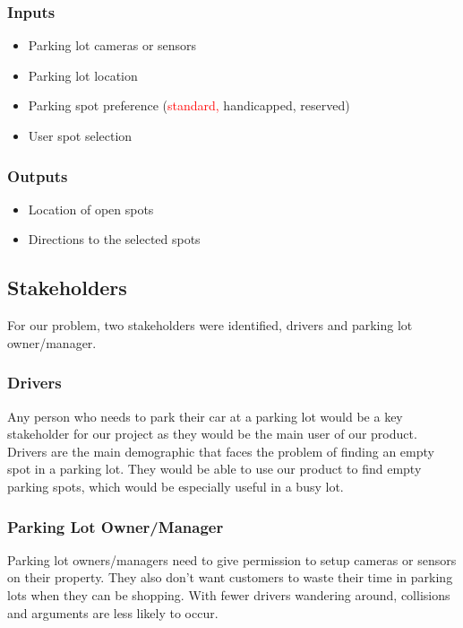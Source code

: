 \documentclass[12pt,letterpaper]{article}
\begin{document}
\subsubsection{Inputs}
\begin{itemize}
    \item Parking lot cameras or sensors
    \item Parking lot location
    \item Parking spot preference (\textcolor{red}{standard, }handicapped,
    reserved)
    \item User spot selection
\end{itemize}

\subsubsection{Outputs}
\begin{itemize}
    \item Location of open spots
    \item Directions to the selected spots
\end{itemize}

\subsection{Stakeholders}
For our problem, two stakeholders were identified, drivers and parking lot
owner/manager.

\subsubsection{Drivers}
Any person who needs to park their car at a parking lot would be a key
stakeholder for our project as they would be the main user of our product.
Drivers are the main demographic that faces the problem of finding an empty spot
in a parking lot. They would be able to use our product to find empty parking
spots, which would be especially useful in a busy lot.

\subsubsection{Parking Lot Owner/Manager}
Parking lot owners/managers need to give permission to setup cameras or sensors
on their property. They also don't want customers to waste their time in parking
lots when they can be shopping. With fewer drivers wandering around, collisions
and arguments are less likely to occur.
\end{document}
